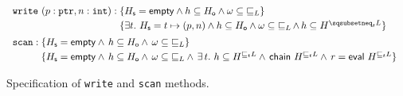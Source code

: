 \begin{figure}
%
\centering
\[
\begin{array}{l}
\mathtt{write}\ (p : \mathtt{ptr}, n : \mathtt{int}) : 
\!\!\!\begin{array}[t]{l}
\{\histS = \hempty \wedge h \subseteq \histO
           \wedge \omega \subseteq {\jleq}\}\\[3pt]
\{\exists t\ldot\, \histS = t \mapsto (p, n) \wedge h \subseteq \histO \wedge
  \omega \subseteq {\jleq}\,{\wedge}\, h \subseteq \chainjltn{\ordlist}{t}\}
\end{array}\\[2em]
%
\mathtt{scan} : 
\!\!\!\begin{array}[t]{l}
\{\histS = \hempty \wedge\, h \subseteq \histO \wedge\,
          \omega \subseteq {\jleq}\}\\[3pt]
          \{\histS = \hempty \wedge\, h \subseteq \histO \wedge\,
            \omega \subseteq {\jleq} \wedge\, \exists\, t\ldot\, %
             h \subseteq \chainjleq{\ordlist}{t} \wedge\,
             \mathsf{chain}\ \chainjleq{\ordlist}{t} \wedge\,
             r = \mathsf{eval}\ \chainjleq{\ordlist}{t}\}
       \end{array}
\end{array}
\]
\caption{\label{fig:specs} Specification of {\tt write} and {\tt scan}
  methods.}
\end{figure}
